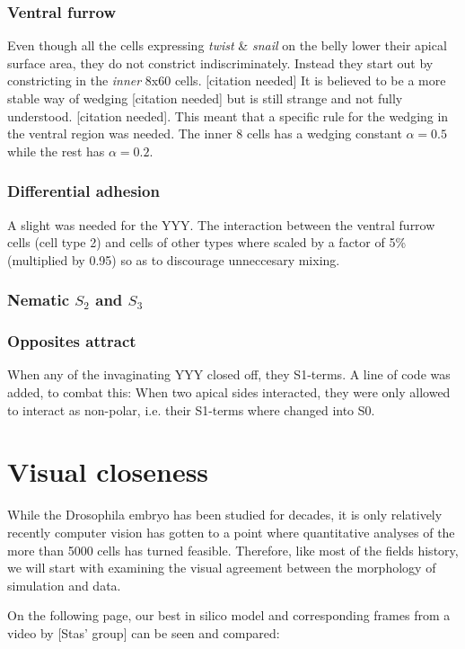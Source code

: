 \subsubsection{Ventral furrow}
Even though all the cells expressing \textit{twist} \& \textit{snail} on the belly lower their apical surface area, they do not constrict indiscriminately. Instead they start out by constricting in the \textit{inner} 8x60 cells. [citation needed] It is believed to be a more stable way of wedging [citation needed] but is still strange and not fully understood. [citation needed]. This meant that a specific rule for the wedging in the ventral region was needed. The inner 8 cells has a wedging constant $\alpha = 0.5$ while the rest has $\alpha = 0.2$.

\subsubsection{Differential adhesion}
A slight was needed for the YYY. The interaction between the ventral furrow cells (cell type 2) and cells of other types where scaled by a factor of 5\% (multiplied by 0.95) so as to discourage unneccesary mixing. 
\subsubsection{Nematic $S_2$ and $S_3$}
\subsubsection{Opposites attract}
When any of the invaginating YYY closed off, they S1-terms. A line of code was added, to combat this: When two apical sides interacted, they were only allowed to interact as non-polar, i.e. their S1-terms where changed into S0.

\newpage

\section{Visual closeness}
While the Drosophila embryo has been studied for decades, it is only relatively recently computer vision has gotten to a point where quantitative analyses of the more than 5000 cells has turned feasible. Therefore, like most of the fields history, we will start with examining the visual agreement between the morphology of simulation and data.

On the following page, our best in silico model and corresponding frames from a video by [Stas' group] can be seen and compared:

